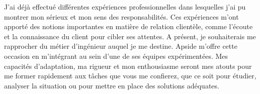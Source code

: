 \documentclass[11pt, a4paper]{awesome-cv}
\begin{document}
\begin{cvletter}
\vspace{2mm} 

J'ai déjà effectué différentes expériences professionnelles dans lesquelles j'ai pu montrer mon sérieux et mon sens des responsabilités. Ces expériences m'ont apporté des notions importantes en matière de relation clientèle, comme l'écoute et la connaissance du client pour cibler ses attentes. A présent, je souhaiterais me rapprocher du métier d'ingénieur auquel je me destine. Apside m'offre cette occasion en m'intégrant au sein d'une de ses équipes expérimentées. Mes capacités d'adaptation, ma rigueur et mon enthousiasme seront mes atouts pour me former rapidement aux tâches que vous me confierez, que ce soit pour étudier, analyser la situation ou pour mettre en place des solutions adéquates.




\end{cvletter}


\makeletterclosing
\end{document}
